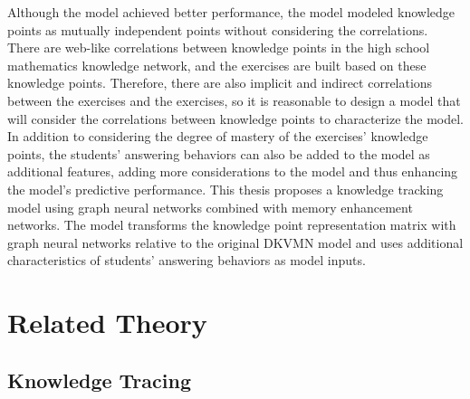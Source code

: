 Although the model achieved better performance, the model modeled knowledge points as mutually independent points without considering the correlations. There are web-like correlations between knowledge points in the high school mathematics knowledge network, and the exercises are built based on these knowledge points. Therefore, there are also implicit and indirect correlations between the exercises and the exercises, so it is reasonable to design a model that will consider the correlations between knowledge points to characterize the model. In addition to considering the degree of mastery of the exercises' knowledge points, the students' answering behaviors can also be added to the model as additional features, adding more considerations to the model and thus enhancing the model's predictive performance. This thesis proposes a knowledge tracking model using graph neural networks combined with memory enhancement networks. The model transforms the knowledge point representation matrix with graph neural networks relative to the original DKVMN model and uses additional characteristics of students' answering behaviors as model inputs.


\section{Related Theory}
\subsection{Knowledge Tracing}


